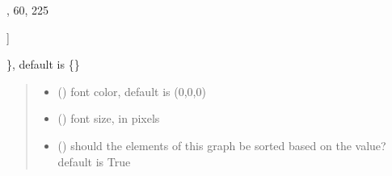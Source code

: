 \documentclass[letterpaper,10pt,english]{sphinxmanual}
\begin{document}
\begin{fulllineitems}
\begin{quote}
\begin{description}
\end{description}\end{quote}
\begin{description}
\begin{description}
\sphinxlineitem{\{}\begin{description}
\sphinxlineitem{“United States”: {[}}
,
60,
225

\end{description}

\sphinxAtStartPar
{]}

\end{description}

\sphinxAtStartPar
\}, default is \{\}

\end{description}
\begin{quote}\begin{description}
\begin{itemize}
\item {} 
\sphinxAtStartPar
{} () \textendash{} font color, default is (0,0,0)

\item {} 
\sphinxAtStartPar
{} () \textendash{} font size, in pixels

\item {} 
\sphinxAtStartPar
{} () \textendash{} should the elements of this graph be sorted based on the value? default is True

\end{itemize}

\end{description}\end{quote}

\begin{fulllineitems}
\label{\detokenize{index:sjvisualizer.Legend.legend.draw}}
\pysigstartsignatures
{}
\pysigstopsignatures
\end{fulllineitems}


\end{fulllineitems}
\end{document}
